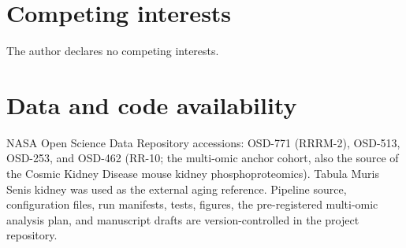 \documentclass[11pt]{article}
\begin{document}
\section*{Competing interests}
The author declares no competing interests.

\section*{Data and code availability}
NASA Open Science Data Repository accessions: OSD-771 (RRRM-2), OSD-513, OSD-253, and OSD-462 (RR-10; the multi-omic anchor cohort, also the source of the Cosmic Kidney Disease mouse kidney phosphoproteomics). Tabula Muris Senis kidney was used as the external aging reference. Pipeline source, configuration files, run manifests, tests, figures, the pre-registered multi-omic analysis plan, and manuscript drafts are version-controlled in the project repository.
\end{document}
